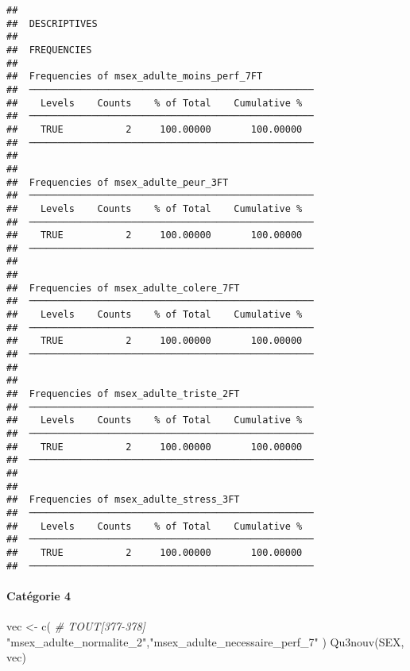 \documentclass[
]{article}
\newenvironment{Shaded}{\begin{snugshade}}{\end{snugshade}}
\newcommand{\CommentTok}[1]{\textcolor[rgb]{0.56,0.35,0.01}{\textit{#1}}}
\newcommand{\FunctionTok}[1]{\textcolor[rgb]{0.00,0.00,0.00}{#1}}
\newcommand{\NormalTok}[1]{#1}
\newcommand{\OtherTok}[1]{\textcolor[rgb]{0.56,0.35,0.01}{#1}}
\newcommand{\StringTok}[1]{\textcolor[rgb]{0.31,0.60,0.02}{#1}}
\begin{document}
\begin{verbatim}
## 
##  DESCRIPTIVES
## 
##  FREQUENCIES
## 
##  Frequencies of msex_adulte_moins_perf_7FT          
##  ────────────────────────────────────────────────── 
##    Levels    Counts    % of Total    Cumulative %   
##  ────────────────────────────────────────────────── 
##    TRUE           2     100.00000       100.00000   
##  ────────────────────────────────────────────────── 
## 
## 
##  Frequencies of msex_adulte_peur_3FT                
##  ────────────────────────────────────────────────── 
##    Levels    Counts    % of Total    Cumulative %   
##  ────────────────────────────────────────────────── 
##    TRUE           2     100.00000       100.00000   
##  ────────────────────────────────────────────────── 
## 
## 
##  Frequencies of msex_adulte_colere_7FT              
##  ────────────────────────────────────────────────── 
##    Levels    Counts    % of Total    Cumulative %   
##  ────────────────────────────────────────────────── 
##    TRUE           2     100.00000       100.00000   
##  ────────────────────────────────────────────────── 
## 
## 
##  Frequencies of msex_adulte_triste_2FT              
##  ────────────────────────────────────────────────── 
##    Levels    Counts    % of Total    Cumulative %   
##  ────────────────────────────────────────────────── 
##    TRUE           2     100.00000       100.00000   
##  ────────────────────────────────────────────────── 
## 
## 
##  Frequencies of msex_adulte_stress_3FT              
##  ────────────────────────────────────────────────── 
##    Levels    Counts    % of Total    Cumulative %   
##  ────────────────────────────────────────────────── 
##    TRUE           2     100.00000       100.00000   
##  ──────────────────────────────────────────────────
\end{verbatim}

\hypertarget{catuxe9gorie-4-4}{%
\paragraph{Catégorie 4}\label{catuxe9gorie-4-4}}

\begin{Shaded}
\begin{Highlighting}[]
\NormalTok{vec }\OtherTok{\textless{}{-}} \FunctionTok{c}\NormalTok{(  }\CommentTok{\# TOUT[377{-}378]}
  \StringTok{"msex\_adulte\_normalite\_2"}\NormalTok{,}\StringTok{"msex\_adulte\_necessaire\_perf\_7"}
\NormalTok{)}
\FunctionTok{Qu3nouv}\NormalTok{(SEX, vec)}
\end{Highlighting}
\end{Shaded}
\end{document}
